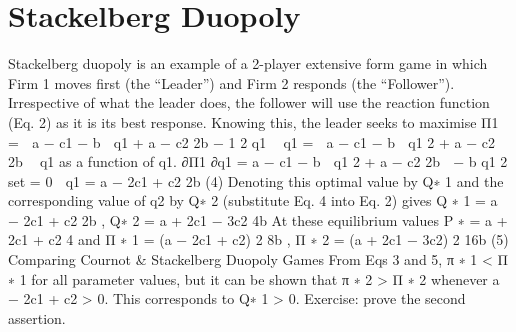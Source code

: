 \section{Stackelberg Duopoly}
Stackelberg duopoly is an example of a 2-player extensive form game in which Firm 1
moves first (the “Leader”) and Firm 2 responds (the “Follower”). Irrespective of what
the leader does, the follower will use the reaction function (Eq. 2) as it is its best response.
Knowing this, the leader seeks to maximise
Π1 =

a − c1 − b

q1 +
a − c2
2b
−
1
2
q1
 q1 =

a − c1 − b

q1
2
+
a − c2
2b
 q1
as a function of q1.
∂Π1
∂q1
= a − c1 − b

q1
2
+
a − c2
2b

− b
q1
2
set = 0
⇒ q1 =
a − 2c1 + c2
2b
(4)
Denoting this optimal value by Q∗
1
and the corresponding value of q2 by Q∗
2
(substitute
Eq. 4 into Eq. 2) gives
Q
∗
1 =
a − 2c1 + c2
2b
, Q∗
2 =
a + 2c1 − 3c2
4b
At these equilibrium values
P
∗ =
a + 2c1 + c2
4
and
Π
∗
1 =
(a − 2c1 + c2)
2
8b
, Π
∗
2 =
(a + 2c1 − 3c2)
2
16b
(5)
Comparing Cournot & Stackelberg Duopoly Games
From Eqs 3 and 5,
π
∗
1 < Π
∗
1
for all parameter values, but it can be shown that
π
∗
2 > Π
∗
2
whenever a − 2c1 + c2 > 0. This corresponds to Q∗
1 > 0.
Exercise: prove the second assertion.
